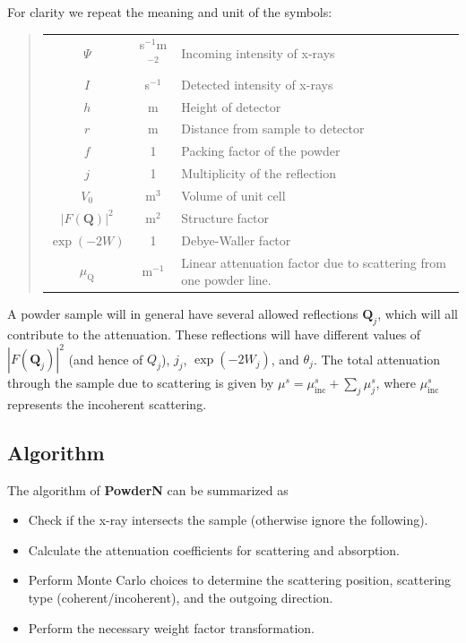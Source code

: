 For clarity we repeat the meaning and unit of the symbols:
%
\begin{quote}\begin{tabular}{ccl}
$\Psi$ & s$^{-1}$m$^{-2}$ & Incoming intensity of x-rays \\
$I$    & s$^{-1}$ & Detected intensity of x-rays \\
$h$    & m        & Height of detector \\
$r$    & m        & Distance from sample to detector \\
$f$    & 1        & Packing factor of the powder \\
$j$    & 1        & Multiplicity of the reflection \\
$V_0$  & m$^{3}$  & Volume of unit cell\\
$|F(\boldsymbol{Q})|^2$ & m$^2$  & Structure factor \\
$\exp(-2W)$ & 1  & Debye-Waller factor \\
$\mu_\mathrm{Q}$ & m$^{-1}$ & Linear attenuation factor due to scattering from
one powder line. \\
\end{tabular}\end{quote}
%

A powder sample will in general have several allowed reflections
$\boldsymbol{Q}_j$, which will all contribute to the attenuation.
These reflections will have different values of
$|F(\boldsymbol{Q}_j)|^2$ (and hence of $Q_j$), $j_j$, $\exp(-2W_j)$,
and $\theta_j$.
The total attenuation through the sample due to scattering is given by
$\mu^s = \mu_\mathrm{inc}^s + \sum_j \mu^s_j $,
where $\mu_\mathrm{inc}^s$ represents the incoherent scattering.

\subsection{Algorithm}
The algorithm of \textbf{PowderN} can be summarized as
\begin{itemize}
\item Check if the x-ray intersects the sample (otherwise ignore
the following).
\item Calculate the attenuation coefficients for scattering and absorption.
\item Perform Monte Carlo choices to determine the scattering position,
scattering type (coherent/incoherent), and the outgoing direction.
\item Perform the necessary weight factor transformation.
\end{itemize}

